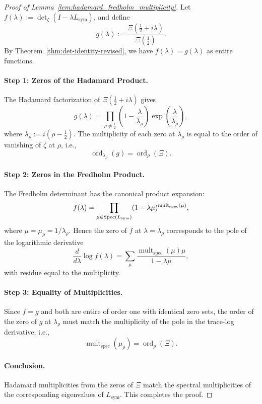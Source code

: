 \begin{proof}[Proof of Lemma~\ref{lem:hadamard_fredholm_multiplicity}]
Let \( f(\lambda) := \det\nolimits_\zeta(I - \lambda L_{\mathrm{sym}}) \), and define
\[
g(\lambda) := \frac{\Xi\left( \tfrac{1}{2} + i\lambda \right)}{\Xi\left( \tfrac{1}{2} \right)}.
\]
By Theorem~\ref{thm:det-identity-revised}, we have \( f(\lambda) = g(\lambda) \) as entire functions.

\paragraph{Step 1: Zeros of the Hadamard Product.}
The Hadamard factorization of \( \Xi\left( \tfrac{1}{2} + i\lambda \right) \) gives
\[
g(\lambda) = \prod_{\rho \ne \tfrac{1}{2}} \left(1 - \frac{\lambda}{\lambda_\rho}\right) \exp\left( \frac{\lambda}{\lambda_\rho} \right),
\]
where \( \lambda_\rho := i(\rho - \tfrac{1}{2}) \). The multiplicity of each zero at \( \lambda_\rho \) is equal to the order of vanishing of \( \zeta \) at \( \rho \), i.e.,
\[
\operatorname{ord}_{\lambda_\rho}(g) = \operatorname{ord}_\rho(\Xi).
\]

\paragraph{Step 2: Zeros in the Fredholm Product.}
The Fredholm determinant has the canonical product expansion:
\[
f(\lambda) = \prod_{\mu \in \operatorname{Spec}(L_{\mathrm{sym}})} (1 - \lambda \mu)^{\operatorname{mult}_{\mathrm{spec}}(\mu)},
\]
where \(\mu = \mu_\rho = 1/\lambda_\rho\). Hence the zero of \( f \) at \( \lambda = \lambda_\rho \) corresponds to the pole of the logarithmic derivative
\[
\frac{d}{d\lambda} \log f(\lambda) = \sum_\mu \frac{\operatorname{mult}_{\mathrm{spec}}(\mu) \mu}{1 - \lambda \mu},
\]
with residue equal to the multiplicity.

\paragraph{Step 3: Equality of Multiplicities.}
Since \( f = g \) and both are entire of order one with identical zero sets, the order of the zero of \( g \) at \( \lambda_\rho \) must match the multiplicity of the pole in the trace-log derivative, i.e.,
\[
\operatorname{mult}_{\mathrm{spec}}(\mu_\rho) = \operatorname{ord}_\rho(\Xi).
\]

\paragraph{Conclusion.}
Hadamard multiplicities from the zeros of \( \Xi \) match the spectral multiplicities of the corresponding eigenvalues of \( L_{\mathrm{sym}} \). This completes the proof.
\end{proof}
% 
